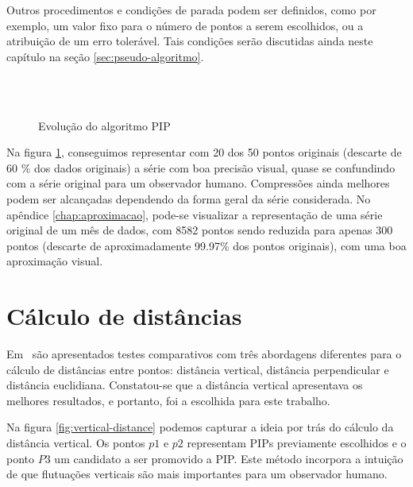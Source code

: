 Outros procedimentos e condições de parada podem ser definidos, como por exemplo, um valor fixo para o número de pontos a serem escolhidos, ou a atribuição de um erro tolerável. Tais condições serão discutidas ainda neste capítulo na seção \ref{sec:pseudo-algoritmo}.

\begin{figure}[htb!]
  \begin{center}
    \\
    \\
    \centering
    \caption{Evolução do algoritmo PIP}
    \label{fig:evolucao}
  \end{center}
\end{figure}
\pagebreak

Na figura \ref{fig:evolucao}, conseguimos representar com 20 dos 50 pontos originais (descarte de 60 \% dos dados originais) a série com boa precisão visual, quase se confundindo com a série original para um observador humano. Compressões ainda melhores podem ser alcançadas dependendo da forma geral da série considerada. No apêndice \ref{chap:aproximacao}, pode-se visualizar a representação de uma série original de um mês de dados, com 8582 pontos sendo reduzida para apenas 300 pontos (descarte de aproximadamente 99.97\% dos pontos originais), com uma boa aproximação visual.


\section{Cálculo de distâncias}
Em~\cite{Fu2008} são apresentados testes comparativos com três abordagens diferentes para o cálculo de distâncias entre pontos: distância vertical, distância perpendicular e distância euclidiana. Constatou-se que a distância vertical apresentava os melhores resultados, e portanto, foi a escolhida para este trabalho.

Na figura \ref{fig:vertical-distance} podemos capturar a ideia por trás do cálculo da distância vertical. Os pontos $p1$ e $p2$ representam PIPs previamente escolhidos e o ponto $P3$ um candidato a ser promovido a PIP.
Este método incorpora a intuição de que flutuações verticais são mais importantes para um observador humano.


